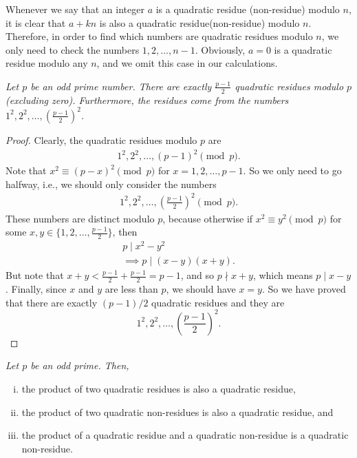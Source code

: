 \documentclass[main.tex]{subfile}
\begin{document}
	\begin{note}
		Whenever we say that an integer $a$ is a quadratic residue (non-residue) modulo $n$, it is clear that $a+kn$ is also a quadratic residue(non-residue) modulo $n$. Therefore, in order to find which numbers are quadratic residues modulo $n$, we only need to check the numbers $1, 2, \ldots, n-1$. Obviously, $a=0$ is a quadratic residue modulo any $n$, and we omit this case in our calculations.
	\end{note}
	
	\begin{theorem}\slshape\label{thm:primeresidue}
		Let $p$ be an odd prime number. There are exactly $\displaystyle \frac{p-1}{2}$ quadratic residues modulo $p$ (excluding zero). Furthermore, the residues come from the numbers $1^2, 2^2, \ldots, \displaystyle \left(\frac{p-1}{2}\right)^2$.
	\end{theorem}
	
	\begin{proof}
		Clearly, the quadratic residues modulo $p$ are
		\begin{align*}
			1^2, 2^2, \ldots, (p-1)^2 \pmod p.
		\end{align*}
		Note that $x^2 \equiv (p-x)^2 \pmod p$ for $x=1,2,\ldots,p-1$. So we only need to go halfway, i.e., we should only consider the numbers
		\begin{align*}
			1^2, 2^2, \ldots, \displaystyle \left(\frac{p-1}{2}\right)^2 \pmod p.
		\end{align*}
		These numbers are distinct modulo $p$, because otherwise if $x^2 \equiv y^2 \pmod p$ for some $x,y \in \{1,2,\ldots,\frac{p-1}{2}\}$, then
		\begin{align*}
			p\mid x^2 -y^2\\
			\implies p\mid (x-y)(x+y).
		\end{align*}
		But note that $x+y< \frac{p-1}{2}+\frac{p-1}{2}=p-1$, and so $p \nmid x+y$, which means $p\mid x-y$. Finally, since $x$ and $y$ are less than $p$, we should have $x=y$.
		So we have proved that there are exactly $(p-1)/2$ quadratic residues and they are
		\begin{equation*}
			1^2, 2^2, \ldots, \displaystyle \left(\frac{p-1}{2}\right)^2. 
		\end{equation*}
	\end{proof}
	
	\begin{theorem}\slshape\label{thm:qrnr}
		Let $p$ be an odd prime. Then,
		\begin{enumerate}[(i)]
			\item the product of two quadratic residues is also a quadratic residue,
			\item the product of two quadratic non-residues is also a quadratic residue, and
			\item the product of a quadratic residue and a quadratic non-residue is a quadratic non-residue.
		\end{enumerate}
	\end{theorem}
	
\end{document}
